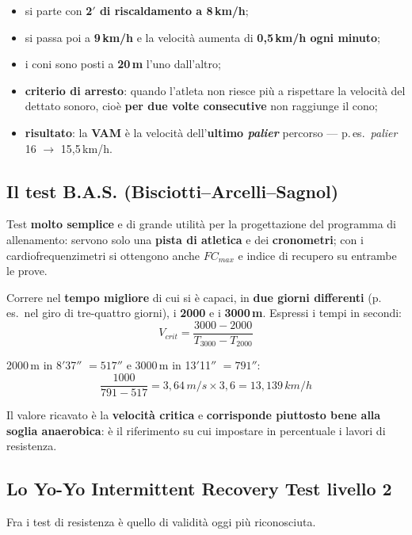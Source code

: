 \begin{itemize}
  \item si parte con \textbf{2$'$ di riscaldamento a 8\,km/h};
  \item si passa poi a \textbf{9\,km/h} e la velocità aumenta di \textbf{0,5\,km/h ogni minuto};
  \item i coni sono posti a \textbf{20\,m} l'uno dall'altro;
  \item \textbf{criterio di arresto}: quando l'atleta non riesce più a rispettare la velocità del
    dettato sonoro, cioè \textbf{per due volte consecutive} non raggiunge il cono;
  \item \textbf{risultato}: la \textbf{VAM} è la velocità dell'\textbf{ultimo \textit{palier}}
    percorso --- p.\,es.\ \textit{palier} 16 $\rightarrow$ 15,5\,km/h.
\end{itemize}

\subsection{Il test B.A.S. (Bisciotti--Arcelli--Sagnol)}

Test \textbf{molto semplice} e di grande utilità per la progettazione del programma di allenamento:
servono solo una \textbf{pista di atletica} e dei \textbf{cronometri}; con i cardiofrequenzimetri si
ottengono anche $FC_{max}$ e indice di recupero su entrambe le prove.

Correre nel \textbf{tempo migliore} di cui si è capaci, in \textbf{due giorni differenti} (p.\,es.\
nel giro di tre-quattro giorni), i \textbf{2000} e i \textbf{3000\,m}. Espressi i tempi in secondi:
\[
  V_{crit} = \frac{3000 - 2000}{T_{3000} - T_{2000}}
\]

2000\,m in 8$'$37$''$ $= 517''$ e 3000\,m in 13$'$11$''$ $= 791''$:
\[
  \frac{1000}{791 - 517} = 3{,}64\,m/s \times 3{,}6 = 13{,}139\,km/h
\]

Il valore ricavato è la \textbf{velocità critica} e \textbf{corrisponde piuttosto bene alla soglia
anaerobica}: è il riferimento su cui impostare in percentuale i lavori di resistenza.

\subsection{Lo Yo-Yo Intermittent Recovery Test livello 2}

Fra i test di resistenza è quello di validità oggi più riconosciuta.

